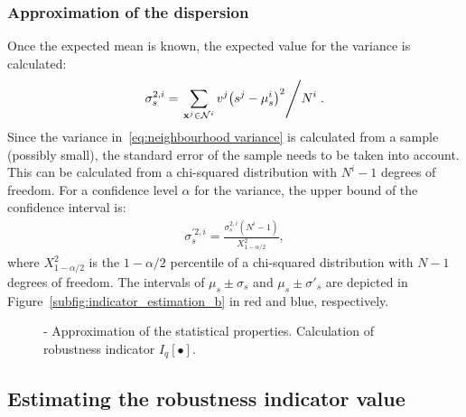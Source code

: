 \documentclass[10pt]{llncs}
\newcommand{\brr}[1]{{\left({#1}\right)}} %
\newcommand{\Iq}[1]{I_q\!\left[{#1}\right]} %
\newcommand{\vx}{\mathbf{x}} %
\newcommand{\NSet}{\mathcal{N}} %
\begin{document}
\subsubsection{Approximation of the dispersion}
Once the expected mean is known, the expected value for the variance is calculated:
\begin{align}
	\label{eq:neighbourhood variance}	\sigma^{2,i}_s = \left. \sum_{\vx^j\in\NSet^i} v^j \brr{s^j - \mu^i_s}^2 \middle/ N^i \right. .
\end{align}
Since the variance in~\eqref{eq:neighbourhood variance} is calculated from a sample (possibly small), the standard error of the sample needs to be taken into account. 
This can be calculated from a chi-squared distribution with $N^i-1$ degrees of freedom.
For a confidence level $\alpha$ for the variance, the upper bound of the confidence interval is:
\begin{align}
	\label{eq:variance upper bound} \sigma^{\prime 2,i}_s = \frac{\sigma^{2,i}_s\brr{N^i-1}} {X^2_{1-\alpha/2}},
\end{align}
where $X^2_{1-\alpha/2}$ is the $1-\alpha/2$ percentile of a chi-squared distribution with $N-1$ degrees of freedom.
The intervals of $\mu_s\pm\sigma_s$ and $\mu_s\pm\sigma'_s$ are depicted in Figure~\ref{subfig:indicator_estimation_b} in red and blue, respectively.

\begin{figure}%
\centering
{}
\hspace{2mm}
\caption{- Approximation of the statistical properties.  Calculation of robustness indicator $\Iq{\bullet}$.}
\label{fig:indicator_estimation}
\end{figure}

\subsection{Estimating the robustness indicator value}
\label{subsec:robustness indicators}
\end{document}

